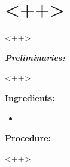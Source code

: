 \section{<++>} %
<++> %

\textbf{\large{\emph{Preliminaries:}}}

<++>

\begin{multicols}{2}\raggedcolumns
\textbf{Ingredients:}

\begin{itemize}
	\item <++>
\end{itemize}

%
%
\columnbreak

\textbf{Procedure:}

<++>

\end{multicols}
